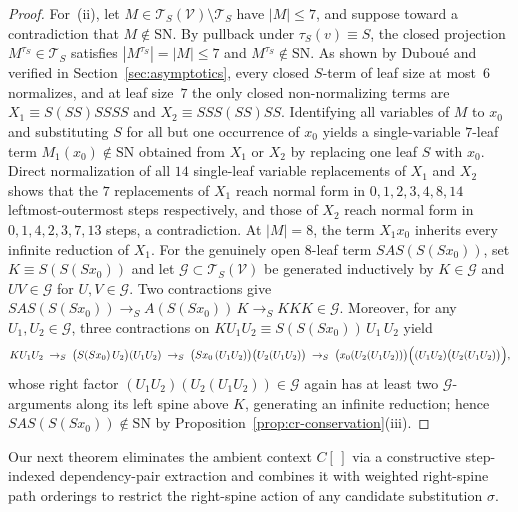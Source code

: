 \documentclass[11pt,reqno]{amsart}
\numberwithin{equation}{section}
\theoremstyle{plain}
\theoremstyle{definition}
\theoremstyle{remark}
\newcommand{\TS}{\mathcal{T}_S}
\newcommand{\TSV}{\mathcal{T}_S(\mathcal{V})}
\newcommand{\SN}{\mathrm{SN}}
\newcommand{\redS}{\to_S}
\begin{document}
\begin{proof}
For~(ii), let $M \in \TSV \setminus \TS$ have $|M| \le 7$, and suppose toward a contradiction that $M \notin \SN$. By pullback under $\tau_S(v) \equiv S$, the closed projection $M^{\tau_S} \in \TS$ satisfies $|M^{\tau_S}| = |M| \le 7$ and $M^{\tau_S} \notin \SN$. As shown by Dubou\'e \cite{BarendregtBergstraKlopVolken1976} and verified in Section~\ref{sec:asymptotics}, every closed $S$-term of leaf size at most~$6$ normalizes, and at leaf size~$7$ the only closed non-normalizing terms are $X_1 \equiv S(S S)S S S S$ and $X_2 \equiv S S S(S S)S S$. Identifying all variables of $M$ to $x_0$ and substituting $S$ for all but one occurrence of $x_0$ yields a single-variable $7$-leaf term $M_1(x_0) \notin \SN$ obtained from $X_1$ or $X_2$ by replacing one leaf $S$ with $x_0$. Direct normalization of all $14$ single-leaf variable replacements of $X_1$ and $X_2$ shows that the $7$ replacements of $X_1$ reach normal form in $0, 1, 2, 3, 4, 8, 14$ leftmost-outermost steps respectively, and those of $X_2$ reach normal form in $0, 1, 4, 2, 3, 7, 13$ steps, a contradiction. At $|M| = 8$, the term $X_1 x_0$ inherits every infinite reduction of $X_1$. For the genuinely open $8$-leaf term $S A S (S(S x_0))$, set $K \equiv S(S(S x_0))$ and let $\mathcal{G} \subset \TSV$ be generated inductively by $K \in \mathcal{G}$ and $U V \in \mathcal{G}$ for $U, V \in \mathcal{G}$. Two contractions give $S A S (S(S x_0)) \redS A(S(S x_0))\,K \redS K K K \in \mathcal{G}$. Moreover, for any $U_1, U_2 \in \mathcal{G}$, three contractions on $K U_1 U_2 \equiv S(S(S x_0))\,U_1\,U_2$ yield
\[
  K U_1 U_2 \;\redS\; \bigl(S(S x_0)\,U_2\bigr)(U_1 U_2) \;\redS\; \bigl(S x_0\,(U_1 U_2)\bigr)\bigl(U_2(U_1 U_2)\bigr) \;\redS\; \bigl(x_0(U_2(U_1 U_2))\bigr)\Bigl((U_1 U_2)\bigl(U_2(U_1 U_2)\bigr)\Bigr),
\]
whose right factor $(U_1 U_2)(U_2(U_1 U_2)) \in \mathcal{G}$ again has at least two $\mathcal{G}$-arguments along its left spine above $K$, generating an infinite reduction; hence $S A S (S(S x_0)) \notin \SN$ by Proposition~\ref{prop:cr-conservation}(iii).
\end{proof}

Our next theorem eliminates the ambient context $C[\,]$ via a constructive step-indexed dependency-pair extraction and combines it with weighted right-spine path orderings to restrict the right-spine action of any candidate substitution $\sigma$.
\end{document}
